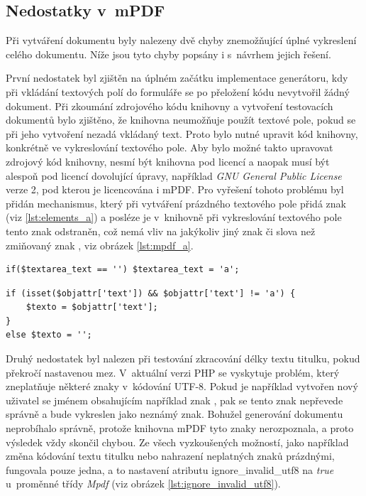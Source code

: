 \subsection{Nedostatky v~mPDF}
\label{subsec:nedostatky_v_mpdf}
Při vytváření dokumentu byly nalezeny dvě chyby znemožňující úplné vykreslení celého dokumentu. Níže jsou tyto chyby popsány i s~návrhem jejich řešení.
\par
První nedostatek byl zjištěn na úplném začátku implementace generátoru, kdy při vkládání textových polí do formuláře se po přeložení kódu nevytvořil žádný dokument. Při zkoumání zdrojového kódu knihovny a vytvoření testovacích dokumentů bylo zjištěno, že knihovna neumožňuje použít textové pole, pokud se při jeho vytvoření nezadá vkládaný text. Proto bylo nutné upravit kód knihovny, konkrétně ve vykreslování textového pole. Aby bylo možné takto upravovat zdrojový kód knihovny, nesmí být knihovna pod licencí a naopak musí  být alespoň pod licencí dovolující úpravy, například \textit{GNU General Public License} verze 2, pod kterou je licencována i mPDF. Pro vyřešení tohoto problému byl přidán mechanismus, který při vytváření prázdného textového pole přidá znak  (viz \ref{lst:elements_a}) a posléze je v~knihovně při vykreslování textového pole tento znak odstraněn, což nemá vliv na jakýkoliv jiný znak či slova než zmiňovaný znak , viz obrázek \ref{lst:mpdf_a}.
\begin{lstlisting}[caption = {Dočasné přiřazení znaku \uv{\textbf{a}} do textového pole (Elements.php)}, label = {lst:elements_a}, captionpos=b]
if($textarea_text == '') $textarea_text = 'a';
\end{lstlisting}
\begin{lstlisting}[caption = {Odstranění znaku \uv{\textbf{a}} z~textového pole (Mpdf.php)}, label = {lst:mpdf_a}, captionpos=b]
if (isset($objattr['text']) && $objattr['text'] != 'a') {
	$texto = $objattr['text'];
}
else $texto = '';
\end{lstlisting}
\par
Druhý nedostatek byl nalezen při testování zkracování délky textu titulku, pokud překročí nastavenou mez. V~aktuální verzi PHP se vyskytuje problém, který zneplatňuje některé znaky v~kódování UTF-8. Pokud je například vytvořen nový uživatel se jménem obsahujícím například znak , pak se tento znak nepřevede správně a bude vykreslen jako neznámý znak. Bohužel generování dokumentu neprobíhalo správně, protože knihovna mPDF tyto znaky nerozpoznala, a proto výsledek vždy skončil chybou. Ze všech vyzkoušených možností, jako například změna kódování textu titulku nebo nahrazení neplatných znaků prázdnými, fungovala pouze jedna, a to nastavení atributu ignore\_invalid\_utf8 na \textit{true} u~proměnné třídy \textit{Mpdf} (viz obrázek \ref{lst:ignore_invalid_utf8}).
